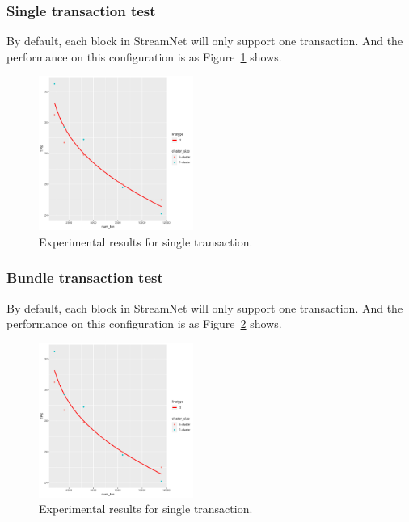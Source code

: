 \subsubsection {Single transaction test}
By default, each block in StreamNet will only support one transaction. And the performance on this configuration is as Figure~\ref{single_txn} shows.

\begin{figure}[!ht]
\begin{center}
\includegraphics[width=0.45\textwidth]{figures/single_txn.pdf}
    \caption{
        Experimental results for single transaction.
     }
\label{single_txn}
\end{center}
\end{figure}



\subsubsection {Bundle transaction test}

By default, each block in StreamNet will only support one transaction. And the performance on this configuration is as Figure~\ref{multi_txn} shows.

\begin{figure}[!ht]
\begin{center}
\includegraphics[width=0.45\textwidth]{figures/single_txn.pdf}
    \caption{
        Experimental results for single transaction.
     }
\label{multi_txn}
\end{center}
\end{figure}


